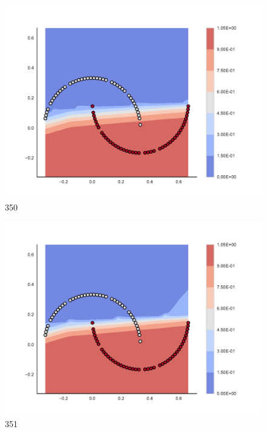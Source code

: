 \begin{subfigure}[b]{0.09\textwidth}
    \includegraphics[clip, trim=2.35cm 1.75cm 4.5cm 0cm,width=\textwidth]{img/convergence/350.pdf}
    \caption{350}
    \label{fig:convergence_350}
\end{subfigure}
%
\begin{subfigure}[b]{0.09\textwidth}
    \includegraphics[clip, trim=2.35cm 1.75cm 4.5cm 0cm,width=\textwidth]{img/convergence/351.pdf}
    \caption{351}
    \label{fig:convergence_351}
\end{subfigure}
%
